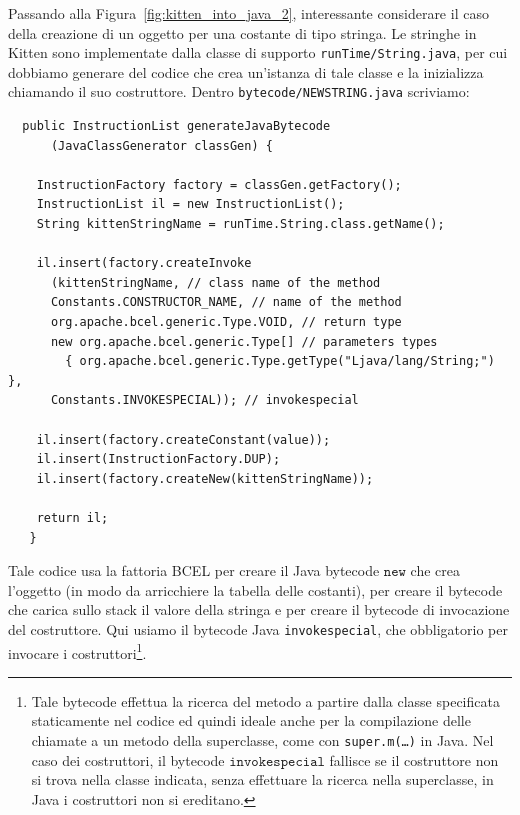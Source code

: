 Passando alla Figura~\ref{fig:kitten_into_java_2}, \e interessante considerare il caso
della creazione di un oggetto per una costante di tipo stringa. Le stringhe
in Kitten sono implementate dalla classe di supporto
\texttt{runTime/String.java}, per cui
dobbiamo generare del codice che crea un'istanza di tale classe e la inizializza chiamando il
suo costruttore. Dentro \texttt{bytecode/NEWSTRING.java} scriviamo:
%
\begin{verbatim}
  public InstructionList generateJavaBytecode
      (JavaClassGenerator classGen) {

    InstructionFactory factory = classGen.getFactory();
    InstructionList il = new InstructionList();
    String kittenStringName = runTime.String.class.getName();

    il.insert(factory.createInvoke
      (kittenStringName, // class name of the method
      Constants.CONSTRUCTOR_NAME, // name of the method
      org.apache.bcel.generic.Type.VOID, // return type
      new org.apache.bcel.generic.Type[] // parameters types
        { org.apache.bcel.generic.Type.getType("Ljava/lang/String;") },
      Constants.INVOKESPECIAL)); // invokespecial

    il.insert(factory.createConstant(value));
    il.insert(InstructionFactory.DUP);
    il.insert(factory.createNew(kittenStringName));

    return il;
   }
\end{verbatim}
%
Tale codice usa la fattoria BCEL per creare il Java bytecode $\mathtt{new}$ che
crea l'oggetto (in modo da arricchiere la tabella delle costanti),
per creare il bytecode che carica sullo stack il valore della stringa e
per creare il bytecode di invocazione del costruttore. Qui usiamo
il bytecode Java \texttt{invokespecial}, che \e obbligatorio per
invocare i costruttori\footnote{Tale bytecode effettua la ricerca del metodo
a partire dalla classe specificata staticamente nel codice ed \e quindi
ideale anche per la compilazione delle chiamate a un metodo della superclasse,
come con \texttt{super.m(\ldots)} in Java. Nel caso dei costruttori, il
bytecode $\mathtt{invokespecial}$ fallisce se il costruttore non si trova nella classe
indicata, senza effettuare la ricerca nella superclasse, \poiche in Java i
costruttori non si ereditano.}.
